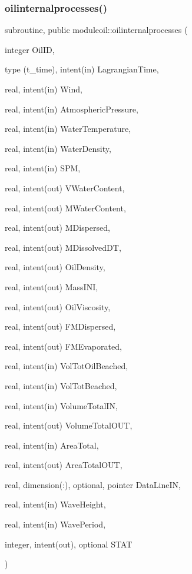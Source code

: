 \subsubsection{\texorpdfstring{oilinternalprocesses()}{oilinternalprocesses()}}
{\footnotesize\ttfamily subroutine, public moduleoil\+::oilinternalprocesses (\begin{DoxyParamCaption}\item[{integer}]{Oil\+ID,  }\item[{type (t\+\_\+time), intent(in)}]{Lagrangian\+Time,  }\item[{real, intent(in)}]{Wind,  }\item[{real, intent(in)}]{Atmospheric\+Pressure,  }\item[{real, intent(in)}]{Water\+Temperature,  }\item[{real, intent(in)}]{Water\+Density,  }\item[{real, intent(in)}]{S\+PM,  }\item[{real, intent(out)}]{V\+Water\+Content,  }\item[{real, intent(out)}]{M\+Water\+Content,  }\item[{real, intent(out)}]{M\+Dispersed,  }\item[{real, intent(out)}]{M\+Dissolved\+DT,  }\item[{real, intent(out)}]{Oil\+Density,  }\item[{real, intent(out)}]{Mass\+I\+NI,  }\item[{real, intent(out)}]{Oil\+Viscosity,  }\item[{real, intent(out)}]{F\+M\+Dispersed,  }\item[{real, intent(out)}]{F\+M\+Evaporated,  }\item[{real, intent(in)}]{Vol\+Tot\+Oil\+Beached,  }\item[{real, intent(in)}]{Vol\+Tot\+Beached,  }\item[{real, intent(in)}]{Volume\+Total\+IN,  }\item[{real, intent(out)}]{Volume\+Total\+O\+UT,  }\item[{real, intent(in)}]{Area\+Total,  }\item[{real, intent(out)}]{Area\+Total\+O\+UT,  }\item[{real, dimension(\+:), optional, pointer}]{Data\+Line\+IN,  }\item[{real, intent(in)}]{Wave\+Height,  }\item[{real, intent(in)}]{Wave\+Period,  }\item[{integer, intent(out), optional}]{S\+T\+AT }\end{DoxyParamCaption})}

